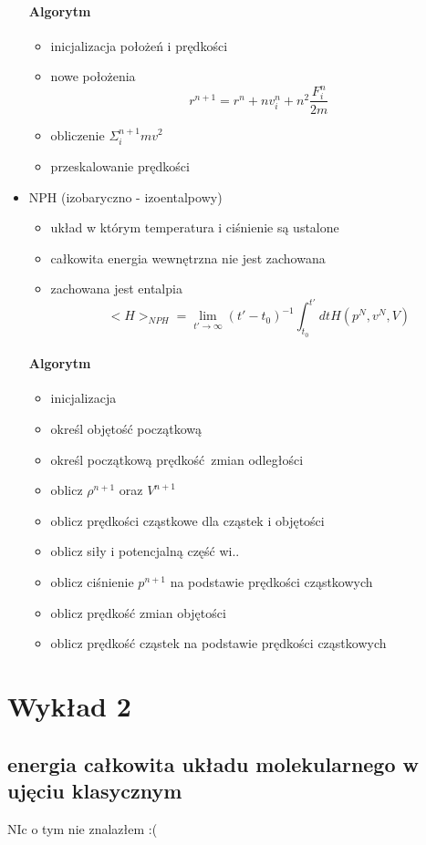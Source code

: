 \documentclass{article}
\begin{document}
\begin{itemize}
				\paragraph{Algorytm}
				\begin{itemize}
					\item inicjalizacja położeń i prędkości
					\item nowe położenia
					$$r^{n+1} = r^n + nv_i^n  + n^2 \frac{F_i^n}{2m}$$
					\item obliczenie $\Sigma_i^{n+1}mv^2$
					\item przeskalowanie prędkości
				\end{itemize}
			\item NPH (izobaryczno - izoentalpowy)
			\begin{itemize}
				\item układ w którym temperatura i ciśnienie są ustalone
				\item całkowita energia wewnętrzna nie jest zachowana
				\item zachowana jest entalpia
				$$<H>_{NPH} = \lim\limits_{t' \rightarrow \infty}(t' - t_0)^{-1}\int_{t_0}^{t'}dtH(p^N, v^N, V)$$
			\end{itemize} 
			\paragraph{Algorytm}
			\begin{itemize}
				\item inicjalizacja
				\item określ objętość początkową 
				\item określ początkową prędkość zmian odległości
				\item oblicz $\rho ^ {n+1}$ oraz $V^{n+1}$
				\item oblicz prędkości cząstkowe dla cząstek i objętości 
				\item oblicz siły i potencjalną część wi..
				\item oblicz ciśnienie $p^{n+1}$ na podstawie prędkości cząstkowych
				\item oblicz prędkość zmian objętości
				\item oblicz prędkość cząstek na podstawie prędkości cząstkowych
			\end{itemize}
		\end{itemize}
		\section{Wykład 2}
		\subsection{energia całkowita układu molekularnego w ujęciu klasycznym}
		NIc o tym nie znalazłem :(
		
\end{document}
